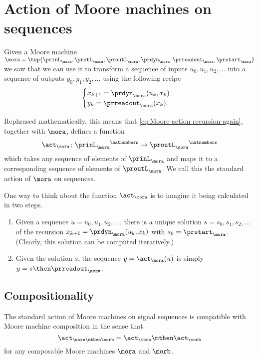 
\section{Action of Moore machines on sequences}
\label{sec:Moore-acting-on-sequences}

Given a Moore machine $\mora = \tup{\prinL_\mora,\prstL_\mora,\proutL_\mora,\prdyn_\mora,\prreadout_\mora,\prstart_\mora}$
we saw that we can use it to transform a sequence of inputs $u_0, u_1, u_2, \dots$ into a sequence of outputs $y_0, y_1, y_2, \dots$ using the following recipe
\begin{equation}
    \label{eq:Moore-action-recursion-again}
    \begin{cases}
        x_{k+1} = \prdyn_\mora(u_k, x_k) \\
        y_{k}   = \prreadout_\mora(x_{k}).
    \end{cases}
\end{equation}

Rephrased mathematically, this means that \cref{eq:Moore-action-recursion-again}, together with $\mora$, defines a function $$ \act_{\mora} \colon {\prinL_\mora}^\natnumbers \to {\proutL_\mora}^\natnumbers$$ which takes any sequence  of elements of $\prinL_\mora$ and maps it to a corresponding sequence  of elements of $\proutL_\mora$.  We call this the standard action of $\mora$ on sequences. 


\begin{remark}
\label{re:moore-action-two-steps}
One way to think about the function $\act_{\mora}$ is to imagine it being calculated in two steps. 
\begin{enumerate}
\item Given a sequence $u = u_0, u_1, u_2, \dots$, there is a unique solution $s = s_0, s_1, s_2, \dots$ of the recursion $x_{k+1} = \prdyn_\mora(u_k, x_k)$ with $s_0 = \prstart_\mora$. (Clearly, this solution can be computed iteratively.) 
\item Given the solution $s$, the sequence $y = \act_{\mora}(u)$ is simply $y = s \then \prreadout_\mora$. 
\end{enumerate}
\end{remark}

\subsection{Compositionality}

\begin{proposition}
The standard action of Moore machines on signal sequences is compatible with Moore machine composition in the sense that
\begin{equation}
\label{eq:moore-action-compositional}
\act_{\mora \mthen \morb} = \act_\mora \mthen \act_\morb
\end{equation}
for any composable Moore machines $\mora$ and $\morb$. 
\end{proposition}

